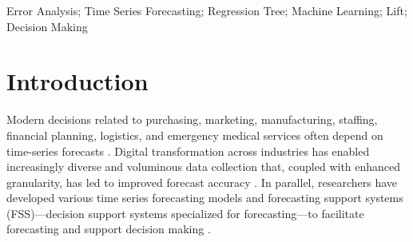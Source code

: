 \documentclass[]{interact}
\newcommand{\spacingset}[1]{}
\theoremstyle{definition}
\begin{document}
\begin{abstract}
\end{abstract}

\begin{keywords}
Error Analysis; Time Series Forecasting; Regression Tree; Machine Learning; Lift; Decision Making
\end{keywords}

\newpage
\spacingset{1.75}

\section{Introduction}
\label{sec:Intro}
Modern decisions related to purchasing, marketing, manufacturing, staffing, financial planning, logistics, and emergency medical services often depend on time-series forecasts \citep{abreu2023}. Digital transformation across industries has enabled increasingly diverse and voluminous data collection that, coupled with enhanced granularity, has led to improved forecast accuracy \citep{chae2024}. In parallel, researchers have developed various time series forecasting models and forecasting support systems (FSS)---decision support systems specialized for forecasting---to facilitate forecasting and support decision making \citep{%
petropoulos2022}. %
\end{document}
